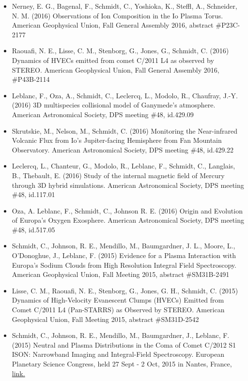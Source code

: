 \documentclass[12pt]{report}
\begin{document}
\begin{itemize}
   \item Nerney, E. G., Bagenal, F., Schmidt, C., Yoshioka, K., Steffl, A., Schneider, N. M. (2016) Observations of Ion Composition in the Io Plasma Torus. American Geophysical Union, Fall General Assembly 2016, abstract \#P23C-2177
   \item Raouafi, N. E., Lisse, C. M., Stenborg, G., Jones, G., Schmidt, C. (2016) Dynamics of HVECs emitted from comet C/2011 L4 as observed by STEREO. American Geophysical Union, Fall General Assembly 2016, \#P43B-2114
   \item Leblanc, F., Oza, A., Schmidt, C., Leclercq, L., Modolo, R., Chaufray, J.-Y. (2016) 3D multispecies collisional model of Ganymede's atmosphere. American Astronomical Society, DPS meeting \#48, id.429.09
   \item Skrutskie, M., Nelson, M., Schmidt, C. (2016) Monitoring the Near-infrared Volcanic Flux from Io's Jupiter-facing Hemisphere from Fan Mountain Observatory. American Astronomical Society, DPS meeting \#48, id.429.22
   \item Leclercq, L., Chanteur, G., Modolo, R., Leblanc, F., Schmidt, C., Langlais, B., Thebault, E. (2016) Study of the internal magnetic field of Mercury through 3D hybrid simulations. American Astronomical Society, DPS meeting \#48, id.117.01
   \item Oza, A. Leblanc, F., Schmidt, C., Johnson R. E. (2016) Origin and Evolution of Europa's Oxygen Exosphere. American Astronomical Society, DPS meeting \#48, id.517.05
   \item Schmidt, C., Johnson, R. E., Mendillo, M., Baumgardner, J. L., Moore, L., O'Donoghue, J., Leblanc, F. (2015) Evidence for a Plasma Interaction with Europa's Sodium Clouds from High Resolution Integral Field Spectroscopy. American Geophysical Union, Fall Meeting 2015, abstract \#SM31B-2491
   \item Lisse, C. M., Raouafi, N. E., Stenborg, G., Jones, G. H., Schmidt, C. (2015) Dynamics of High-Velocity Evanescent Clumps (HVECs) Emitted from Comet C/2011 L4 (Pan-STARRS) as Observed by STEREO. American Geophysical Union, Fall Meeting 2015, abstract \#SM31D-2542
   \item Schmidt, C., Johnson, R. E., Mendillo, M., Baumgardner, J., Leblanc, F. (2015) Neutral and Plasma Distributions in the Coma of Comet C/2012 S1 ISON: Narrowband Imaging and Integral-Field Spectroscopy. European Planetary Science Congress, held 27 Sept - 2 Oct, 2015 in Nantes, France, \href{https://meetingorganizer.copernicus.org/EPSC2015/EPSC2015-315-2.pdf}{link.} 

\end{itemize}
\end{document}
